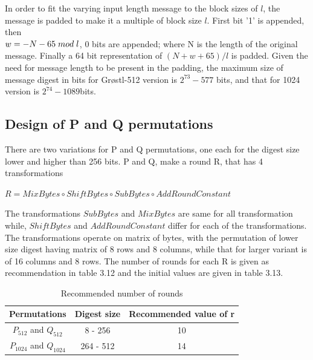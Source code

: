   In order to fit the varying input length message to the block sizes of $ l $, the message is padded to make it a
  multiple of block size $l$. First bit '1' is
  appended, then\\ $ w = -N - 65 \thickspace mod \thickspace l $, 0 bits are appended; where N is the length of the
  original message. Finally a 64 bit representation of $(N + w + 65) / l $ is padded. Given the need for message length
  to be present in the padding, the maximum size of message digest in bits for Gr{\o}stl-512 version is 
  $2^{73}-577$ bits, and that for 1024 version is $2^{74}-1089$bits.

  \subsection{Design of P and Q permutations}

  There are two variations for P and Q permutations, one each for the digest size lower and higher than 256 bits. P
  and Q, make a round R, that has 4 transformations
  \begin{center}$ R = MixBytes \circ ShiftBytes \circ SubBytes \circ AddRoundConstant $ \end{center}
  The transformations $SubBytes$ and $MixBytes$ are same for all transformation while, $ShiftBytes$ and $AddRoundConstant$
  differ for each of the transformations. The transformations operate on matrix of bytes, with the permutation of lower size
  digest having matrix of 8 rows and 8 columns, while that for larger variant is of 16 columns and 8 rows. The number of 
  rounds for each R is given as recommendation in table 3.12 and the initial values are given in table 3.13.
  
  \begin{table}
    \begin{center}
      \begin{tabular}{ *{3}{c} } \hline
        Permutations            & Digest size & Recommended value of r \\ \hline
        $P_{512}$ and $Q_{512}$   & 8 - 256     & 10 \\
        $P_{1024}$ and $Q_{1024}$ & 264 - 512   & 14 \\ \hline 
      \end{tabular}
      \caption{Recommended number of rounds \cite{00019}}
    \end{center}
  \end{table}

